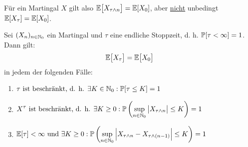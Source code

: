 \begin{bemerkung}
	Für ein Martingal $X$ gilt also $\E\big[X_{\tau\wedge n}\big]=\E[X_0]$, aber \ul{nicht} unbedingt $\E[X_\tau]=\E[X_0]$.
\end{bemerkung}

\begin{theorem}\enter\label{theorem3.3}
	Sei $(X_n)_{n\in\N_0}$ ein Martingal und $\tau$ eine endliche Stoppzeit, d. h. $\P[\tau<\infty]=1$. Dann gilt:
	\begin{align}\label{eqTheorem3.3}
		\E\big[X_\tau\big]=\E\big[X_0\big]
	\end{align}
	in jedem der folgenden Fälle:
	\begin{enumerate}[label=\alph*)]
		\item $\begin{aligned}
			\tau\text{ ist beschränkt, d. h. }\exists K\in\N_0:\P[\tau\leq K]=1
		\end{aligned}$
		\item $
		\begin{aligned}
			X^\tau\text{ ist beschränkt, d. h. }\exists K\geq0:\P\left(\sup\limits_{n\in\N_0}\big| X_{\tau\wedge n}\big|\leq K\right)=1
		\end{aligned}$
		\item $\begin{aligned}
			\E[\tau]<\infty\text{ und }\exists K\geq0:\P\left(\sup\limits_{n\in\N_0}\Big|X_{\tau\wedge n}-X_{\tau\wedge(n-1)}\Big|\leq K\right)=1
		\end{aligned}$
	\end{enumerate}
\end{theorem}

